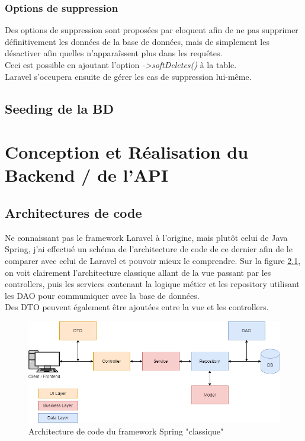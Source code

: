 \documentclass[
    iai, %
    il, %
]{heig-tb}
\begin{document}
\subsection{Options de suppression}
Des options de suppression sont proposées par \Gls{eloquent} afin de ne pas supprimer définitivement les données de la base de données, mais de simplement les désactiver afin quelles n'apparaîssent plus dans les requêtes.\\
Ceci est possible en ajoutant l'option \emph{->softDeletes()} à la table.\\
Laravel s'occupera ensuite de gérer les cas de suppression lui-même.

\section{Seeding de la BD}

\chapter{Conception et Réalisation du Backend / de l'API}

\section{Architectures de code}

Ne connaissant pas le framework Laravel à l'origine, mais plutôt celui de Java Spring, j'ai effectué
un schéma de l'architecture de code de ce dernier afin de le comparer avec celui de Laravel et
pouvoir mieux le comprendre. Sur la figure \ref{architecture-code-spring}, on voit clairement
l'architecture classique allant de la vue passant par les controllers, puis les services contenant
la logique métier et les repository utilisant les DAO pour commumiquer avec la base de données. \\
Des DTO peuvent également être ajoutées entre la vue et les controllers.

\begin{center}
    \begin{figure}
        \includegraphics[width=\textwidth]{./assets/figures/architecture-code-spring.drawio.png}
        \caption{Architecture de code du framework Spring "classique" \label{architecture-code-spring}}
    \end{figure}
\end{center}
\end{document}
